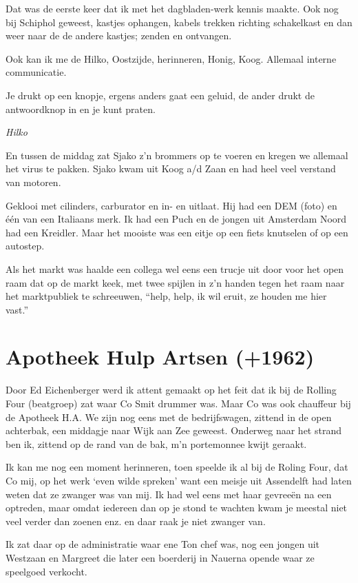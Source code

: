 \documentclass[10pt,twoside,openright]{memoir}
\begin{document}
Dat was de eerste keer dat ik met het dagbladen-werk kennis maakte. Ook nog bij Schiphol geweest, kastjes ophangen, kabels trekken richting schakelkast en dan weer naar de de andere kastjes; zenden en ontvangen. 

Ook kan ik me de Hilko, Oostzijde, herinneren, Honig, Koog. Allemaal interne communicatie. 

Je drukt op een knopje, ergens anders gaat een geluid, de ander drukt de antwoordknop in en je kunt praten.	

\emph{Hilko}

En tussen de middag zat Sjako z'n brommers op te voeren en kregen we allemaal het virus te pakken. Sjako kwam uit Koog a/d Zaan en had heel veel verstand van motoren. 

Geklooi met cilinders, carburator en in- en uitlaat. Hij had een DEM (foto) en één van een Italiaans merk. Ik had een Puch en de jongen uit Amsterdam Noord had een Kreidler. Maar het mooiste was een eitje op een fiets knutselen of op een autostep.

Als het markt was haalde een collega wel eens een trucje uit door voor het open raam dat op de markt keek, met twee spijlen in z'n handen tegen het raam naar het marktpubliek te schreeuwen, “help, help, ik wil eruit, ze houden me hier vast.”

\chapter{Apotheek Hulp Artsen (+1962)} %
\label{cha:apotheek}

Door Ed Eichenberger werd ik attent gemaakt op het feit dat ik bij de Rolling Four (beatgroep) zat waar Co Smit drummer was. Maar Co was ook chauffeur bij de Apotheek H.A. We zijn nog eens met de bedrijfswagen, zittend in de open achterbak, een middagje naar Wijk aan Zee geweest. Onderweg naar het strand ben ik, zittend op de rand van de bak, m’n portemonnee kwijt geraakt.

Ik kan me nog een moment herinneren, toen speelde ik al bij de Roling Four, dat Co mij, op het werk `even wilde spreken' want een meisje uit Assendelft had laten weten dat ze zwanger was van mij. Ik had wel eens met haar gevreeën na een optreden, maar omdat iedereen dan op je stond te wachten kwam je meestal niet veel verder dan zoenen enz. en daar raak je niet zwanger van. 

Ik zat daar op de administratie waar ene Ton chef was, nog een jongen uit Westzaan en Margreet die later een boerderij in Nauerna opende waar ze speelgoed verkocht. 
\end{document}
